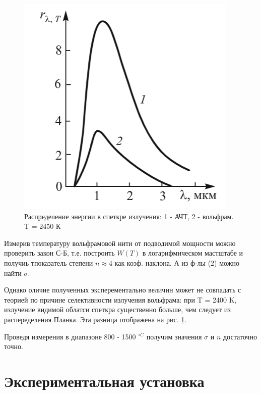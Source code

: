 \documentclass[a4paper]{article}
\begin{document}
\begin{figure}[h]
\begin{center}
\begin{minipage}[h]{0.45\linewidth}
	\includegraphics[width=1\linewidth]{p3.png}
	\caption{Распределение энергии в спеткре излучения: 1 - АЧТ, 2 - вольфрам. T = 2450 К}
	\label{p3}
	\end{minipage}
	\end{center}
\end{figure}

Измерив температуру вольфрамовой нити от подводимой мощности можно проверить закон С-Б, т.е. построить $W(T)$ в логарифмическом
мастштабе и получиь тпоказатель степени $n \approx 4$ как коэф. наклона. А из ф-лы (2) можно найти $\sigma$. \par

Однако оличие полученных эксперементально величин может не совпадать с теорией по причине селективности излучения 
вольфрама: при T = 2400 K, излучение видимой облатси спеткра существенно больше, чем следует из распеределения Планка. Эта 
разница отображена на рис. \ref{p3}. \par 

Проведя измерения в диапазоне 800 - 1500 $^{\circ C}$ получим значения $\sigma$ и $n$ достаточно точно.



\section{Экспериментальная установка}
\end{document}

